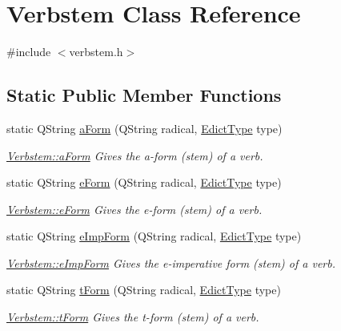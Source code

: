 \hypertarget{class_verbstem}{}\section{Verbstem Class Reference}
\label{class_verbstem}


{\ttfamily \#include $<$verbstem.\+h$>$}

\subsection*{Static Public Member Functions}
\begin{DoxyCompactItemize}
\item 
static Q\+String \hyperlink{class_verbstem_aeed17d02506f4897fa36a45b04d39d03}{a\+Form} (Q\+String radical, \hyperlink{type_defs_8h_a44f9030d5e119edcb703fea53ceb7a1b}{Edict\+Type} type)
\begin{DoxyCompactList}\small\item\em \hyperlink{class_verbstem_aeed17d02506f4897fa36a45b04d39d03}{Verbstem\+::a\+Form} Gives the a-\/form (stem) of a verb. \end{DoxyCompactList}\item 
static Q\+String \hyperlink{class_verbstem_abfba98ad5122aa0b78f31b8ff55bac7d}{e\+Form} (Q\+String radical, \hyperlink{type_defs_8h_a44f9030d5e119edcb703fea53ceb7a1b}{Edict\+Type} type)
\begin{DoxyCompactList}\small\item\em \hyperlink{class_verbstem_abfba98ad5122aa0b78f31b8ff55bac7d}{Verbstem\+::e\+Form} Gives the e-\/form (stem) of a verb. \end{DoxyCompactList}\item 
static Q\+String \hyperlink{class_verbstem_aacebbfba4fd6f8832bf409b5dd52b107}{e\+Imp\+Form} (Q\+String radical, \hyperlink{type_defs_8h_a44f9030d5e119edcb703fea53ceb7a1b}{Edict\+Type} type)
\begin{DoxyCompactList}\small\item\em \hyperlink{class_verbstem_aacebbfba4fd6f8832bf409b5dd52b107}{Verbstem\+::e\+Imp\+Form} Gives the e-\/imperative form (stem) of a verb. \end{DoxyCompactList}\item 
static Q\+String \hyperlink{class_verbstem_ade956b530e7399c0dc3621beaeb9d289}{t\+Form} (Q\+String radical, \hyperlink{type_defs_8h_a44f9030d5e119edcb703fea53ceb7a1b}{Edict\+Type} type)
\begin{DoxyCompactList}\small\item\em \hyperlink{class_verbstem_ade956b530e7399c0dc3621beaeb9d289}{Verbstem\+::t\+Form} Gives the t-\/form (stem) of a verb. \end{DoxyCompactList}\item 

\end{DoxyCompactItemize}
